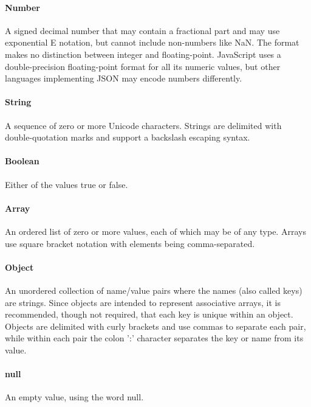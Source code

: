 \paragraph{Number} A signed decimal number that may contain a fractional part and may use exponential E notation, but cannot include non-numbers like NaN. The format makes no distinction between integer and floating-point. JavaScript uses a double-precision floating-point format for all its numeric values, but other languages implementing JSON may encode numbers differently.
\paragraph{String} A sequence of zero or more Unicode characters. Strings are delimited with double-quotation marks and support a backslash escaping syntax.
\paragraph{Boolean} Either of the values true or false.
\paragraph{Array} An ordered list of zero or more values, each of which may be of any type. Arrays use square bracket notation with elements being comma-separated.
\paragraph{Object} An unordered collection of name/value pairs where the names (also called keys) are strings. Since objects are intended to represent associative arrays, it is recommended, though not required, that each key is unique within an object. Objects are delimited with curly brackets and use commas to separate each pair, while within each pair the colon ':' character separates the key or name from its value.
\paragraph{null} An empty value, using the word null.

